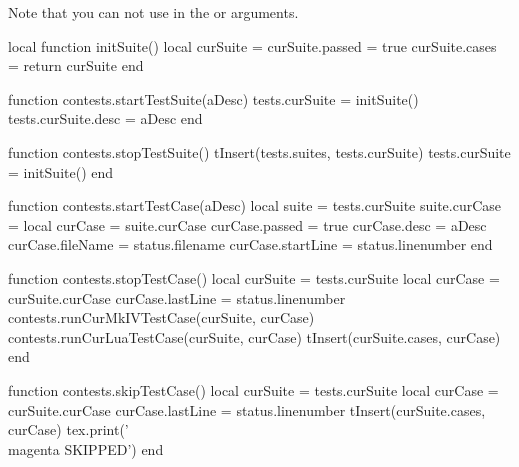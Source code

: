 
\startchapter[title=Unit Test Suites]

Note that you can not use  in the \type{\startTestSuite} or 
\type{\startTestCase} arguments. 

\startMkIVCode

\def\startTestSuite[#1]{%
  \startsubsection[title=Test Suite: #1]
  \directlua{thirddata.contests.startTestSuite("#1")}
}

\def\stopTestSuite{%
  \stopsubsection%
  \directlua{thirddata.contests.stopTestSuite()}
}

\def\startTestCase[#1]{%
  \starttextrule{Test case}
  \noindent {\tfa #1} \godown[2ex]
  \directlua{thirddata.contests.startTestCase("#1")}
}

\def\stopTestCase{%
  \directlua{thirddata.contests.stopTestCase()}
  \stoptextrule%
}

\def\skipTestCase{%
  \directlua{thirddata.contests.skipTestCase()}
  \stoptextrule%
}

\def\reportFailures{%
  \directlua{thirddata.contests.reportFailures()}
}

\stopMkIVCode

\startLuaCode

local function initSuite()
  local curSuite = {}
  curSuite.passed = true
  curSuite.cases  = {}
  return curSuite
end

function contests.startTestSuite(aDesc)
  tests.curSuite      = initSuite()
  tests.curSuite.desc = aDesc
end

function contests.stopTestSuite()
  tInsert(tests.suites, tests.curSuite)
  tests.curSuite = initSuite()
end

function contests.startTestCase(aDesc)
  local suite       = tests.curSuite
  suite.curCase     = {}
  local curCase     = suite.curCase
  curCase.passed    = true
  curCase.desc      = aDesc
  curCase.fileName  = status.filename
  curCase.startLine = status.linenumber
end

function contests.stopTestCase()
  local curSuite   = tests.curSuite
  local curCase    = curSuite.curCase
  curCase.lastLine = status.linenumber
  contests.runCurMkIVTestCase(curSuite, curCase)
  contests.runCurLuaTestCase(curSuite, curCase)
  tInsert(curSuite.cases, curCase)
end

function contests.skipTestCase()
  local curSuite   = tests.curSuite
  local curCase    = curSuite.curCase
  curCase.lastLine = status.linenumber
  tInsert(curSuite.cases, curCase)
  tex.print('{\\magenta SKIPPED}')
end

